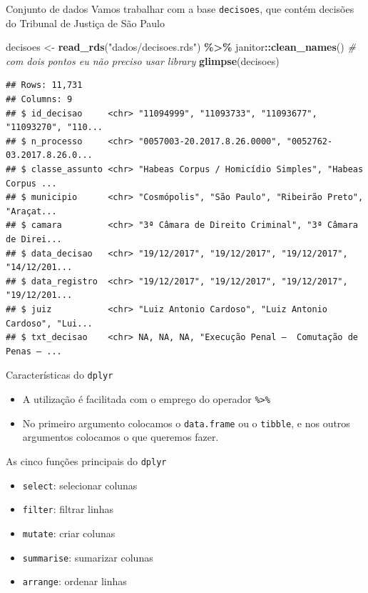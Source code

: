 \documentclass[
  10pt,
  ignorenonframetext,
]{beamer}
\newenvironment{Shaded}{\begin{snugshade}}{\end{snugshade}}
\newcommand{\CommentTok}[1]{\textcolor[rgb]{0.56,0.35,0.01}{\textit{#1}}}
\newcommand{\KeywordTok}[1]{\textcolor[rgb]{0.13,0.29,0.53}{\textbf{#1}}}
\newcommand{\NormalTok}[1]{#1}
\newcommand{\OperatorTok}[1]{\textcolor[rgb]{0.81,0.36,0.00}{\textbf{#1}}}
\newcommand{\StringTok}[1]{\textcolor[rgb]{0.31,0.60,0.02}{#1}}
\begin{document}
\begin{frame}[fragile]{Conjunto de dados}
\protect\hypertarget{conjunto-de-dados}{}
Vamos trabalhar com a base \texttt{decisoes}, que contém decisões do
Tribunal de Justiça de São Paulo

\begin{Shaded}
\begin{Highlighting}[]
\NormalTok{decisoes \textless{}{-}}\StringTok{ }\KeywordTok{read\_rds}\NormalTok{(}\StringTok{"dados/decisoes.rds"}\NormalTok{) }\OperatorTok{\%\textgreater{}\%}
\StringTok{  }\NormalTok{janitor}\OperatorTok{::}\KeywordTok{clean\_names}\NormalTok{() }\CommentTok{\# com dois pontos eu não preciso usar library}
\KeywordTok{glimpse}\NormalTok{(decisoes)}
\end{Highlighting}
\end{Shaded}

\begin{verbatim}
## Rows: 11,731
## Columns: 9
## $ id_decisao     <chr> "11094999", "11093733", "11093677", "11093270", "110...
## $ n_processo     <chr> "0057003-20.2017.8.26.0000", "0052762-03.2017.8.26.0...
## $ classe_assunto <chr> "Habeas Corpus / Homicídio Simples", "Habeas Corpus ...
## $ municipio      <chr> "Cosmópolis", "São Paulo", "Ribeirão Preto", "Araçat...
## $ camara         <chr> "3ª Câmara de Direito Criminal", "3ª Câmara de Direi...
## $ data_decisao   <chr> "19/12/2017", "19/12/2017", "19/12/2017", "14/12/201...
## $ data_registro  <chr> "19/12/2017", "19/12/2017", "19/12/2017", "19/12/201...
## $ juiz           <chr> "Luiz Antonio Cardoso", "Luiz Antonio Cardoso", "Lui...
## $ txt_decisao    <chr> NA, NA, NA, "Execução Penal –  Comutação de Penas – ...
\end{verbatim}
\end{frame}

\begin{frame}[fragile]{Características do \texttt{dplyr}}
\protect\hypertarget{caracteruxedsticas-do-dplyr}{}
\begin{itemize}
\item
  A utilização é facilitada com o emprego do operador
  \texttt{\%\textgreater{}\%}
\item
  No primeiro argumento colocamos o \texttt{data.frame} ou o
  \texttt{tibble}, e nos outros argumentos colocamos o que queremos
  fazer.
\end{itemize}
\end{frame}

\begin{frame}[fragile]{As cinco funções principais do \texttt{dplyr}}
\protect\hypertarget{as-cinco-funuxe7uxf5es-principais-do-dplyr}{}
\begin{itemize}
\item
  \texttt{select}: selecionar colunas
\item
  \texttt{filter}: filtrar linhas
\item
  \texttt{mutate}: criar colunas
\item
  \texttt{summarise}: sumarizar colunas
\item
  \texttt{arrange}: ordenar linhas
\end{itemize}
\end{frame}
\end{document}
